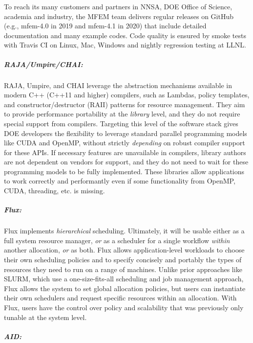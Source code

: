 To reach its many customers and partners in NNSA, DOE Office of Science,
academia and industry, the MFEM team delivers regular releases on GitHub
(e.g., mfem-4.0 in 2019 and mfem-4.1 in 2020) that include
detailed documentation and many example codes.  Code quality is ensured
by smoke tests with Travis CI on Linux, Mac, Windows and nightly
regression testing at LLNL.

\subparagraph{RAJA/Umpire/CHAI:}
RAJA, Umpire, and CHAI leverage the abstraction mechanisms available in
modern C++ (C++11 and higher) compilers, such as Lambdas, policy
templates, and constructor/destructor (RAII) patterns for resource
management.  They aim to provide performance portability at the {\it
library} level, and they do not require special support from compilers.
Targeting this level of the software stack gives DOE developers the
flexibility to leverage standard parallel programming models like CUDA
and OpenMP, without strictly {\it depending} on robust compiler support
for these APIs.  If necessary features are unavailable in compilers,
library authors are not dependent on vendors for support, and they do not
need to wait for these programming models to be fully implemented.  These
libraries allow applications to work correctly and performantly even if
some functionality from OpenMP, CUDA, threading, etc. is missing.

\subparagraph{Flux:}
Flux implements {\it hierarchical} scheduling.  Ultimately, it will be
usable either as a full system resource manager, {\it or} as a scheduler
for a single workflow {\it within} another allocation, {\it or} as both.
Flux allows application-level workloads to choose their own scheduling
policies and to specify concisely and portably the types of resources
they need to run on a range of machines.  Unlike prior approaches like
SLURM, which use a one-size-fits-all scheduling and job management
approach, Flux allows the system to set global allocation policies, but
users can instantiate their own schedulers and request specific resources
within an allocation.  With Flux, users have the control over policy and
scalability that was previously only tunable at the system level.

\subparagraph{AID:}

